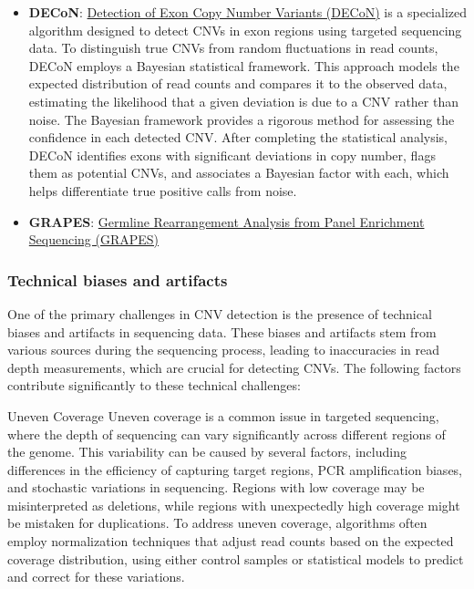 \documentclass[a4paper,12pt,twoside]{ThesisStyle}
\begin{document}
\begin{itemize}

    \item \textbf{DECoN}: \href{https://github.com/RahmanTeam/DECoN}{Detection of Exon Copy Number Variants (DECoN)} is a specialized algorithm designed to detect CNVs in exon regions using targeted sequencing data. To distinguish true CNVs from random fluctuations in read counts, DECoN employs a Bayesian statistical framework. This approach models the expected distribution of read counts and compares it to the observed data, estimating the likelihood that a given deviation is due to a CNV rather than noise. The Bayesian framework provides a rigorous method for assessing the confidence in each detected CNV. After completing the statistical analysis, DECoN identifies exons with significant deviations in copy number, flags them as potential CNVs, and associates a Bayesian factor with each, which helps differentiate true positive calls from noise.
    \item \textbf{GRAPES}: \href{https://github.com/bdolmo/GRAPES}{Germline Rearrangement Analysis from Panel Enrichment Sequencing (GRAPES)}
\end{itemize}



\subsubsection{Technical biases and artifacts}

One of the primary challenges in CNV detection is the presence of technical biases and artifacts in sequencing data. These biases and artifacts stem from various sources during the sequencing process, leading to inaccuracies in read depth measurements, which are crucial for detecting CNVs. The following factors contribute significantly to these technical challenges:

Uneven Coverage
Uneven coverage is a common issue in targeted sequencing, where the depth of sequencing can vary significantly across different regions of the genome. This variability can be caused by several factors, including differences in the efficiency of capturing target regions, PCR amplification biases, and stochastic variations in sequencing. Regions with low coverage may be misinterpreted as deletions, while regions with unexpectedly high coverage might be mistaken for duplications. To address uneven coverage, algorithms often employ normalization techniques that adjust read counts based on the expected coverage distribution, using either control samples or statistical models to predict and correct for these variations.
\end{document}
